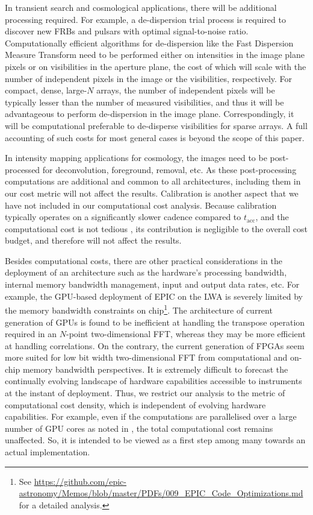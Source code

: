 \documentclass[
  journal=pasa,
  manuscript=article-type,
  year=2020,
  volume=37,
]{cup-journal}
\begin{document}
In transient search and cosmological applications, there will be additional processing required. For example, a de-dispersion trial process is required to discover new FRBs and pulsars with optimal signal-to-noise ratio. Computationally efficient algorithms for de-dispersion like the Fast Dispersion Measure Transform \citep[FDMT;][]{Zackay+2014} need to be performed either on intensities in the image plane pixels or on visibilities in the aperture plane, the cost of which will scale with the number of independent pixels in the image or the visibilities, respectively. For compact, dense, large-$N$ arrays, the number of independent pixels will be typically lesser than the number of measured visibilities, and thus it will be advantageous to perform de-dispersion in the image plane. Correspondingly, it will be computational preferable to de-disperse visibilities for sparse arrays. A full accounting of such costs for most general cases is beyond the scope of this paper.

In intensity mapping applications for cosmology, the images need to be post-processed for deconvolution, foreground, removal, etc. As these post-processing computations are additional and common to all architectures, including them in our cost metric will not affect the results. Calibration is another aspect that we have not included in our computational cost analysis. Because calibration typically operates on a significantly slower cadence compared to $t_\textrm{acc}$, and the computational cost is not tedious \citep{Beardsley+2017,Gorthi+2021}, its contribution is negligible to the overall cost budget, and therefore will not affect the results.

Besides computational costs, there are other practical considerations in the deployment of an architecture such as the hardware's processing bandwidth, internal memory bandwidth management, input and output data rates, etc. For example, the GPU-based deployment of EPIC on the LWA is severely limited by the memory bandwidth constraints on chip\footnote{See \url{https://github.com/epic-astronomy/Memos/blob/master/PDFs/009_EPIC_Code_Optimizations.md} for a detailed analysis.}. The architecture of current generation of GPUs is found to be inefficient at handling the transpose operation required in an $N$-point two-dimensional FFT, whereas they may be more efficient at handling correlations. On the contrary, the current generation of FPGAs seem more suited for low bit width two-dimensional FFT from computational and on-chip memory bandwidth perspectives. It is extremely difficult to forecast the continually evolving landscape of hardware capabilities accessible to instruments at the instant of deployment. Thus, we restrict our analysis to the metric of computational cost density, which is independent of evolving hardware capabilities. For example, even if the computations are parallelised over a large number of GPU cores as noted in \citet{Sokolowski+2024}, the total computational cost remains unaffected. So, it is intended to be viewed as a first step among many towards an actual implementation. 
\end{document}
